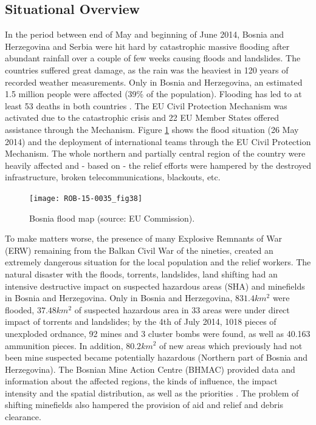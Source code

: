 \documentclass{article}
\begin{document}
\subsection{Situational Overview}
In the period between end of May and beginning of June 2014, Bosnia and Herzegovina and Serbia were hit hard by catastrophic massive flooding after abundant rainfall over a couple of few weeks causing floods and landslides.
The countries suffered great damage, as the rain was the heaviest in 120 years of recorded weather measurements.
Only in Bosnia and Herzegovina, an estimated 1.5 million people were affected (39\% of the population). Flooding has led to at least 53 deaths in both countries \cite{bosnia}.
The  EU  Civil  Protection  Mechanism  was  activated  due  to  the catastrophic crisis and 22 EU Member States offered assistance through the Mechanism.
Figure \ref{fig:bosna} shows the flood situation (26 May 2014) and the deployment of international teams through the EU Civil Protection Mechanism.
The whole northern and partially central region of the country were heavily affected and - based on \cite{bosnia} - the relief efforts were hampered by the destroyed infrastructure, broken telecommunications, blackouts, etc.
\begin{figure}
    \centering
    \texttt{[image: ROB-15-0035\_fig38]}
    \caption{Bosnia flood map (source: EU Commission).}
    \label{fig:bosna}
\end{figure}

To make matters worse, the presence of many Explosive Remnants of War (ERW) remaining from the Balkan Civil War of the nineties, created an extremely dangerous situation for the local population and the relief workers. The natural disaster with the floods, torrents, landslides, land shifting had an intensive destructive impact on suspected hazardous areas (SHA) and minefields in Bosnia and Herzegovina. Only in Bosnia and Herzegovina, $831.4 km^2$ were flooded, $37.48 km^2$ of suspected hazardous area in 33 areas were under direct impact of torrents and landslides; by the 4th of July 2014, 1018 pieces of unexploded ordnance, 92 mines and 3 cluster bombs were found, as well as 40.163 ammunition pieces.
In addition, $80.2 km^2$ of new areas which previously had not been mine suspected became potentially hazardous (Northern part  of  Bosnia and Herzegovina).
The Bosnian Mine Action Centre (BHMAC) provided data and information about the affected regions, the kinds of influence, the impact intensity and the spatial distribution, as well as the priorities \cite{bosnia2}.
The problem of shifting minefields also hampered the provision of aid and relief and debris clearance.
\end{document}
